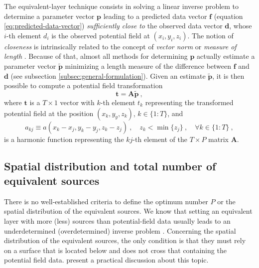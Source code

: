 \documentclass[utf8]{FrontiersinHarvard} %
\begin{document}
	The equivalent-layer technique consists in solving a linear inverse problem to determine a parameter vector $\mathbf{p}$ 
	leading to a predicted data vector $\mathbf{f}$ (equation \ref{eq:predicted-data-vector}) \textit{sufficiently close to} the 
	observed data vector $\mathbf{d}$, whose $i$-th element $d_{i}$ is the observed potential field at $(x_{i}, y_{i}, z_{i})$.
	The notion of \textit{closeness} is intrinsically related to the concept of \textit{vector norm} \cite[e.g.,][p. 68]{golub-vanloan2013}
	or \textit{measure of length} \cite[e.g.,][p. 41]{menke2018}.
	Because of that, almost all methods for determining $\mathbf{p}$ actually estimate a parameter 
	vector $\tilde{\mathbf{p}}$ minimizing a length measure of the difference between $\mathbf{f}$ and $\mathbf{d}$
	(see subsection \ref{subsec:general-formulation}).
	Given an estimate $\tilde{\mathbf{p}}$, it is then possible to compute a potential field transformation 
	\begin{equation}
		\mathbf{t} = \mathbf{A} \tilde{\mathbf{p}} \: ,
		\label{eq:transformation}
	\end{equation}
	where $\mathbf{t}$ is a $T \times 1$ vector with $k$-th element $t_{k}$ representing the transformed potential field at
	the position $(x_{k}, y_{y}, z_{k})$, $k \in \{1:T\}$, and
	\begin{equation}
		a_{kj} \equiv a(x_{k} - x_{j}, y_{k} - y_{j}, z_{k} - z_{j}) \: ,
		\quad z_{k} < \min\{z_{j}\} \: , \quad \forall k \in \{1:T\} \: ,
		\label{eq:harmonic-function-a-kj}
	\end{equation}
	is a harmonic function representing the $kj$-th element of the $T \times P$ matrix $\mathbf{A}$.
	
	\subsection{Spatial distribution and total number of equivalent sources}
	\label{subsec:spatial-distribution-sources}
	
	There is no well-established criteria to define the optimum number $P$ or the spatial distribution
	of the equivalent sources. We know that setting an equivalent layer with more (less) sources than potential-field 
	data usually leads to an underdetermined (overdetermined) inverse problem \cite[e.g.,][ p. 52--53]{menke2018}.
	Concerning the spatial distribution of the equivalent sources, the only condition is that they must rely on a 
	surface that is located below and does not cross that containing the potential field data.
	\citet{soler-uieda2021} present a practical discussion about this topic.
	
\end{document}
